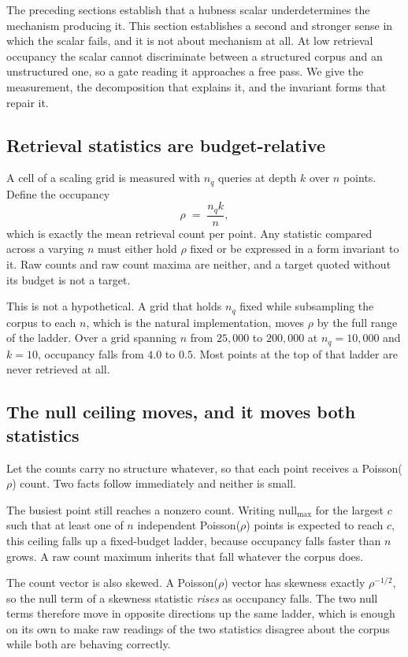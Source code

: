 \documentclass[11pt]{article}
\begin{document}
The preceding sections establish that a hubness scalar underdetermines the
mechanism producing it. This section establishes a second and stronger sense
in which the scalar fails, and it is not about mechanism at all. At low
retrieval occupancy the scalar cannot discriminate between a structured
corpus and an unstructured one, so a gate reading it approaches a free pass.
We give the measurement, the decomposition that explains it, and the
invariant forms that repair it.

\subsection{Retrieval statistics are budget-relative}

A cell of a scaling grid is measured with $n_q$ queries at depth $k$ over
$n$ points. Define the occupancy
\[
\rho \;=\; \frac{n_q k}{n},
\]
which is exactly the mean retrieval count per point. Any statistic compared
across a varying $n$ must either hold $\rho$ fixed or be expressed in a form
invariant to it. Raw counts and raw count maxima are neither, and a target
quoted without its budget is not a target.

This is not a hypothetical. A grid that holds $n_q$ fixed while subsampling
the corpus to each $n$, which is the natural implementation, moves $\rho$ by
the full range of the ladder. Over a grid spanning $n$ from $25{,}000$ to
$200{,}000$ at $n_q = 10{,}000$ and $k = 10$, occupancy falls from $4.0$ to
$0.5$. Most points at the top of that ladder are never retrieved at all.

\subsection{The null ceiling moves, and it moves both statistics}

Let the counts carry no structure whatever, so that each point receives a
Poisson($\rho$) count. Two facts follow immediately and neither is small.

The busiest point still reaches a nonzero count. Writing
$\mathrm{null}_{\max}$ for the largest $c$ such that at least one of $n$
independent Poisson($\rho$) points is expected to reach $c$, this ceiling
falls up a fixed-budget ladder, because occupancy falls faster than $n$
grows. A raw count maximum inherits that fall whatever the corpus does.

The count vector is also skewed. A Poisson($\rho$) vector has skewness
exactly $\rho^{-1/2}$, so the null term of a skewness statistic \emph{rises}
as occupancy falls. The two null terms therefore move in opposite directions
up the same ladder, which is enough on its own to make raw readings of the
two statistics disagree about the corpus while both are behaving correctly.
\end{document}
